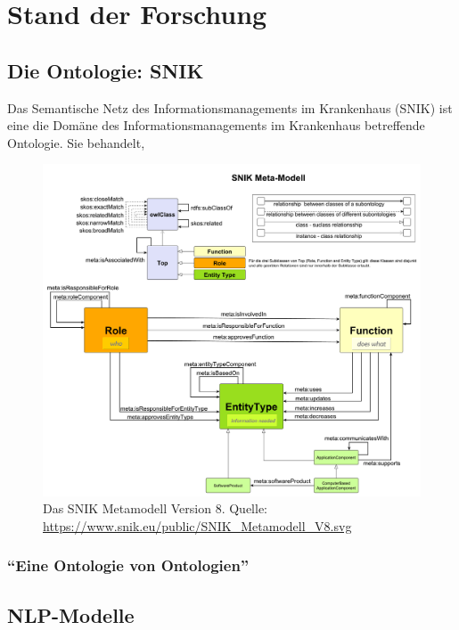 \chapter{Stand der Forschung}\label{ch:relatedWork}

\section{Die Ontologie: SNIK}

Das Semantische Netz des Informationsmanagements im Krankenhaus (SNIK) ist eine die Domäne des Informationsmanagements im Krankenhaus betreffende Ontologie.
Sie behandelt,

\begin{figure}
\centering
\includegraphics[width=.8\textwidth, height=.9\textheight, keepaspectratio]{Images/snik-metamodel.pdf}
\caption[SNIK Metamodell Version 8]{Das SNIK Metamodell Version 8. Quelle: \url{https://www.snik.eu/public/SNIK_Metamodell_V8.svg}}
\label{fig:snik-metamodel}
\end{figure}

\subsection{\enquote{Eine Ontologie von Ontologien}}



\section{NLP-Modelle}

